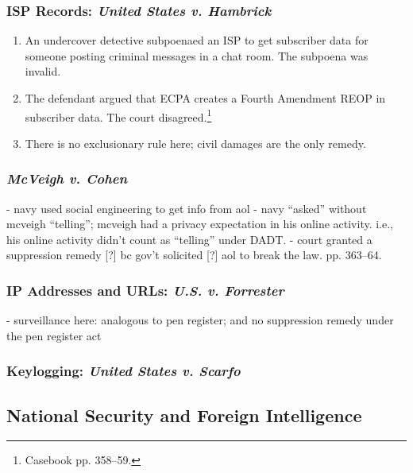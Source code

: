 \subsubsection{ISP Records: \emph{United States v. Hambrick}}


\begin{enumerate}
    \item An undercover detective subpoenaed an ISP to get subscriber data for 
    someone posting criminal messages in a chat room. The subpoena was 
    invalid.
    \item The defendant argued that ECPA creates a Fourth Amendment REOP in 
    subscriber data. The court disagreed.\footnote{Casebook pp. 358--59.}
    \item There is no exclusionary rule here; civil damages are the only 
    remedy.
\end{enumerate}

\subsubsection{\emph{McVeigh v. Cohen}}

- navy used social engineering to get info from aol
- navy ``asked'' without mcveigh ``telling''; mcveigh had a privacy 
expectation in his online activity. i.e., his online activity didn't count as 
``telling'' under DADT.
- court granted a suppression remedy [?] bc gov't solicited [?] aol to break the 
law. pp. 363--64.

\subsubsection{IP Addresses and URLs: \emph{U.S. v. Forrester}}


- surveillance here: analogous to pen register; and no suppression remedy 
under the pen register act

\subsubsection{Keylogging: \emph{United States v. Scarfo}}


\subsection{National Security and Foreign Intelligence}

